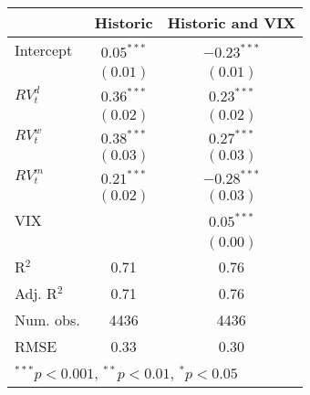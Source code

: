 
\begin{tabular}{l c c }
\hline
 & Historic & Historic and VIX \\
\hline
Intercept    & $0.05^{***}$ & $-0.23^{***}$ \\
             & $(0.01)$     & $(0.01)$      \\
$RV_{t}^{d}$ & $0.36^{***}$ & $0.23^{***}$  \\
             & $(0.02)$     & $(0.02)$      \\
$RV_{t}^{w}$ & $0.38^{***}$ & $0.27^{***}$  \\
             & $(0.03)$     & $(0.03)$      \\
$RV_{t}^{m}$ & $0.21^{***}$ & $-0.28^{***}$ \\
             & $(0.02)$     & $(0.03)$      \\
VIX          &              & $0.05^{***}$  \\
             &              & $(0.00)$      \\
\hline
R$^2$        & 0.71         & 0.76          \\
Adj. R$^2$   & 0.71         & 0.76          \\
Num. obs.    & 4436         & 4436          \\
RMSE         & 0.33         & 0.30          \\
\hline
\multicolumn{3}{l}{\scriptsize{$^{***}p<0.001$, $^{**}p<0.01$, $^*p<0.05$}}
\end{tabular}
